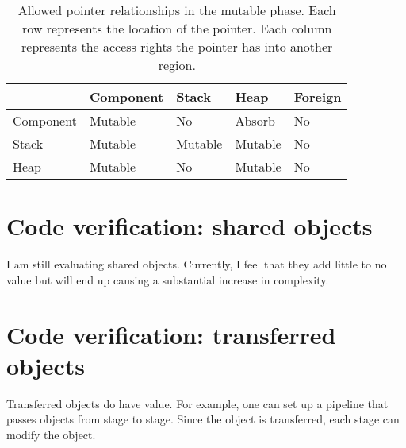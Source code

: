 \documentclass[letterpaper]{article}
\theoremstyle{definition} \newtheorem{constraint}{Constraint}
\begin{document}
\begin{table}
\center
\begin{tabular}{|l|l|l|l|l|}
\hline
          & Component & Stack & Heap    & Foreign  \\
\hline
Component & Mutable & No      & Absorb  & No       \\
\hline
Stack     & Mutable & Mutable & Mutable & No       \\
\hline
Heap      & Mutable & No      & Mutable & No       \\
\hline
\end{tabular}
\caption{Allowed pointer relationships in the mutable phase.  Each row represents the location of the pointer.  Each column represents the access rights the pointer has into another region.}
\label{mutable_phase}
\end{table}

\section{Code verification: shared objects}
I am still evaluating shared objects.
Currently, I feel that they add little to no value but will end up causing a substantial increase in complexity.

\section{Code verification: transferred objects}
Transferred objects do have value.
For example, one can set up a pipeline that passes objects from stage to stage.
Since the object is transferred, each stage can modify the object.







%

%
\end{document}

